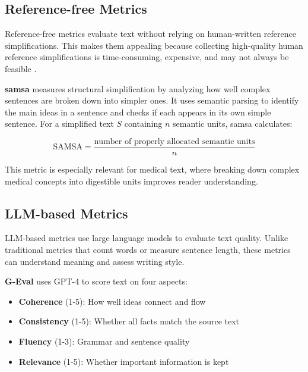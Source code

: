 \subsection{Reference-free Metrics}

Reference-free metrics evaluate text without relying on human-written reference simplifications.
This makes them appealing because collecting high-quality human reference simplifications is time-consuming, expensive, and may not always be feasible \cite{alva-manchego-etal-2021-un, 94205144dd7945cc99b5a6544451b668, deutsch-etal-2022-limitations}.

\textbf{\gls{samsa}} \cite{sulem-etal-2018-semantic} measures structural simplification by analyzing how well complex sentences are broken down into simpler ones. It uses semantic parsing to identify the main ideas in a sentence and checks if each appears in its own simple sentence. For a simplified text $S$ containing $n$ semantic units, \gls{samsa} calculates:

\begin{equation}
   \text{SAMSA} = \frac{\text{number of properly allocated semantic units}}{n}
\end{equation}

This metric is especially relevant for medical text, where breaking down complex medical concepts into digestible units improves reader understanding.

\subsection{LLM-based Metrics}

LLM-based metrics use large language models to evaluate text quality. 
Unlike traditional metrics that count words or measure sentence length, these metrics can understand meaning and assess writing style.

\textbf{G-Eval} \cite{liu-etal-2023-g} uses GPT-4 to score text on four aspects:

\begin{itemize}
   \item \textbf{Coherence} (1-5): How well ideas connect and flow
   \item \textbf{Consistency} (1-5): Whether all facts match the source text
   \item \textbf{Fluency} (1-3): Grammar and sentence quality 
   \item \textbf{Relevance} (1-5): Whether important information is kept
\end{itemize}

